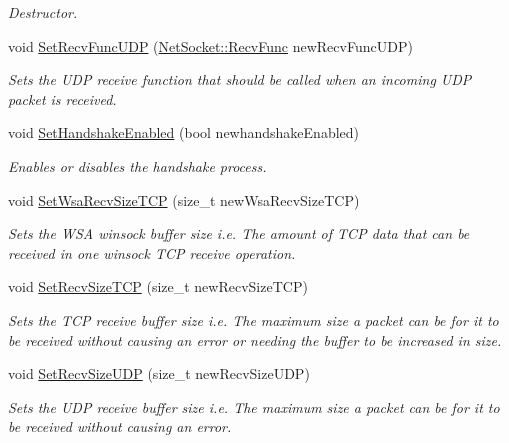 \begin{DoxyCompactItemize}
\begin{DoxyCompactList}\small\item\em Destructor. \item\end{DoxyCompactList}\item 
void \hyperlink{class_net_instance_profile_aea8ecf597e31112af7d8e10217063caa}{SetRecvFuncUDP} (\hyperlink{class_net_socket_a52b5f4de8d0a47fd8620f542b21c076c}{NetSocket::RecvFunc} newRecvFuncUDP)
\begin{DoxyCompactList}\small\item\em Sets the UDP receive function that should be called when an incoming UDP packet is received. \item\end{DoxyCompactList}\item 
void \hyperlink{class_net_instance_profile_a2bd3bbd81542f5a006e88fc45091c8e1}{SetHandshakeEnabled} (bool newhandshakeEnabled)
\begin{DoxyCompactList}\small\item\em Enables or disables the handshake process. \item\end{DoxyCompactList}\item 
void \hyperlink{class_net_instance_profile_a0108f46983695c115e2765f37cfda734}{SetWsaRecvSizeTCP} (size\_\-t newWsaRecvSizeTCP)
\begin{DoxyCompactList}\small\item\em Sets the WSA winsock buffer size i.e. The amount of TCP data that can be received in one winsock TCP receive operation. \item\end{DoxyCompactList}\item 
void \hyperlink{class_net_instance_profile_a79577ee788215ec47931ae3599e5a824}{SetRecvSizeTCP} (size\_\-t newRecvSizeTCP)
\begin{DoxyCompactList}\small\item\em Sets the TCP receive buffer size i.e. The maximum size a packet can be for it to be received without causing an error or needing the buffer to be increased in size. \item\end{DoxyCompactList}\item 
void \hyperlink{class_net_instance_profile_a862741f4e82fd603e27d7d6fc683cc8d}{SetRecvSizeUDP} (size\_\-t newRecvSizeUDP)
\begin{DoxyCompactList}\small\item\em Sets the UDP receive buffer size i.e. The maximum size a packet can be for it to be received without causing an error. \item\end{DoxyCompactList}\item 

\end{DoxyCompactItemize}
